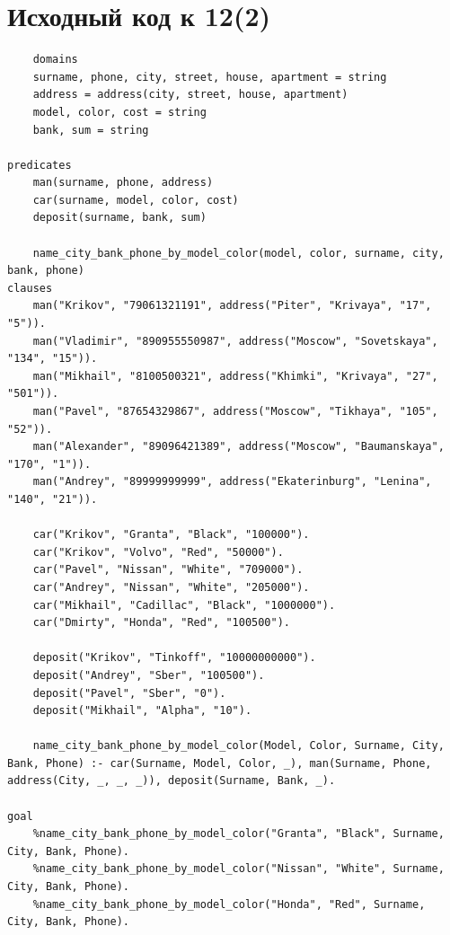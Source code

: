 \documentclass[12pt]{report}
\begin{document}
\section*{Исходный код к 12(2)}
\begin{lstlisting}
	domains
	surname, phone, city, street, house, apartment = string
	address = address(city, street, house, apartment)
	model, color, cost = string
	bank, sum = string

predicates
	man(surname, phone, address)
	car(surname, model, color, cost)
	deposit(surname, bank, sum)

	name_city_bank_phone_by_model_color(model, color, surname, city, bank, phone)
clauses
	man("Krikov", "79061321191", address("Piter", "Krivaya", "17", "5")).
	man("Vladimir", "890955550987", address("Moscow", "Sovetskaya", "134", "15")).
	man("Mikhail", "8100500321", address("Khimki", "Krivaya", "27", "501")).
	man("Pavel", "87654329867", address("Moscow", "Tikhaya", "105", "52")).
	man("Alexander", "89096421389", address("Moscow", "Baumanskaya", "170", "1")).
	man("Andrey", "89999999999", address("Ekaterinburg", "Lenina", "140", "21")).

	car("Krikov", "Granta", "Black", "100000").
	car("Krikov", "Volvo", "Red", "50000").
	car("Pavel", "Nissan", "White", "709000").
	car("Andrey", "Nissan", "White", "205000").
	car("Mikhail", "Cadillac", "Black", "1000000").
	car("Dmirty", "Honda", "Red", "100500").

	deposit("Krikov", "Tinkoff", "10000000000").
	deposit("Andrey", "Sber", "100500").
	deposit("Pavel", "Sber", "0").
	deposit("Mikhail", "Alpha", "10").

	name_city_bank_phone_by_model_color(Model, Color, Surname, City, Bank, Phone) :- car(Surname, Model, Color, _), man(Surname, Phone, address(City, _, _, _)), deposit(Surname, Bank, _).

goal
	%name_city_bank_phone_by_model_color("Granta", "Black", Surname, City, Bank, Phone).
	%name_city_bank_phone_by_model_color("Nissan", "White", Surname, City, Bank, Phone).
	%name_city_bank_phone_by_model_color("Honda", "Red", Surname, City, Bank, Phone).
\end{lstlisting}
\end{document}
